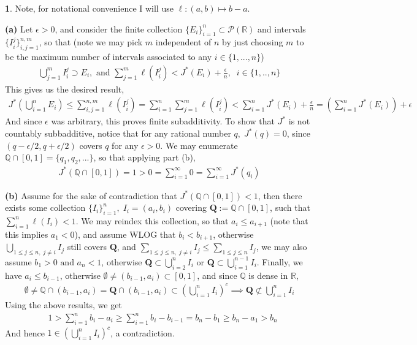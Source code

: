 \documentclass[10.5pt]{article}
\theoremstyle{definition}
\newtheorem{pb}{}
\newcommand{\set}[1]{\{#1\}}
\newcommand{\tand}{\text{ and }}
\newcommand{\tor}{\text{ or }}
\begin{document}
	\begin{pb}
		Note, for notational convenience I will use \(\ell:(a,b) \mapsto b-a\).

		\textbf{(a)} Let \(\epsilon > 0\), and consider the finite collection \(\set{E_i}_{i=1}^n \subset \mathcal{P}(\mathbb{R})\) and intervals \(\set{I_i^j}_{i,j=1}^{n,m}\), so that
		(note we may pick \(m\) independent of \(n\) by just choosing \(m\) to be the maximum number of intervals associated to any \(i \in \set{1,...,n}\))
		\begin{align*}
			\bigcup_{j=1}^m I_i^j \supset E_i, \tand \sum_{j=1}^m \ell(I_i^j) < J^*(E_i) + \frac{\epsilon}{n}, \; \; i \in \set{1,..,n}
		\end{align*}
		This gives us the desired result,
		\begin{align*}
			J^*(\bigcup_{i=1}^n E_i) \leq \sum_{i,j=1}^{n,m} \ell(I_i^j) = \sum_{i=1}^n\sum_{j=1}^m \ell(I_i^j) < \sum_{i=1}^n J^*(E_i) + \frac{\epsilon}{n} = \left(\sum_{i=1}^n J^*(E_i)\right) + \epsilon
		\end{align*}
		And since \(\epsilon\) was arbitrary, this proves finite subadditivity. To show that \(J^*\) is not countably subbadditive, notice that
		for any rational number \(q, \; J^*(q) = 0\), since \((q-\epsilon/2,q+\epsilon/2)\) covers \(q\) for any \(\epsilon > 0\). We may enumerate
		\(\mathbb{Q}\cap[0,1] = \set{q_1,q_2,...}\), so that applying part (b),
		\begin{align*}
			J^*(\mathbb{Q}\cap[0,1]) = 1 > 0 = \sum_{i=1}^\infty 0 = \sum_{i=1}^\infty J^*(q_i)
		\end{align*}

		\textbf{(b)} Assume for the sake of contradiction that \(J^*(\mathbb{Q}\cap[0,1]) < 1\), then there exists some collection 
		\(\set{I_i}_{i=1}^n, \; I_i = (a_i,b_i)\) covering \(\mathbf{Q} := \mathbb{Q}\cap[0,1]\), such that \(\sum_{i=1}^n \ell(I_i) < 1\). We may reindex this collection, so that
		\(a_i \leq a_{i+1}\) (note that this implies \(a_1 < 0\)), and assume WLOG that \(b_i < b_{i+1}\), otherwise \(\bigcup_{1 \leq j \leq n, \; j \neq i} I_j\) still covers \(\mathbf{Q}\), and
		\(\sum_{1 \leq j \leq n, \; j \neq i} I_j \leq \sum_{1 \leq j \leq n} I_j\), 
		we may also assume \(b_1 > 0 \tand a_n < 1\), otherwise \(\mathbf{Q} \subset \bigcup_{i=2}^n I_i \tor \mathbf{Q}\subset\bigcup_{i=1}^{n-1} I_i\).
		Finally, we have \(a_i \leq b_{i-1}\), otherwise \(\emptyset \neq (b_{i-1},a_i) \subset [0,1]\), and since \(\mathbb{Q}\) is dense in \(\mathbb{R}\),
		\begin{align*}
			\emptyset \neq \mathbb{Q}\cap(b_{i-1},a_i) = \mathbf{Q}\cap(b_{i-1},a_i) \subset (\bigcup_{i=1}^n I_i)^c \implies \mathbf{Q} \not \subset \bigcup_{i=1}^n I_i
		\end{align*}
		Using the above results, we get
		\begin{align*}
			&1 > \sum_{i=1}^n b_i - a_i \geq \sum_{i=1}^n b_i - b_{i-1} = b_n - b_1 \geq b_n - a_1 > b_n
		\end{align*}
		And hence \(1 \in (\bigcup_{i=1}^n I_i)^c\), a contradiction. \newline
		

\end{pb}
\end{document}
